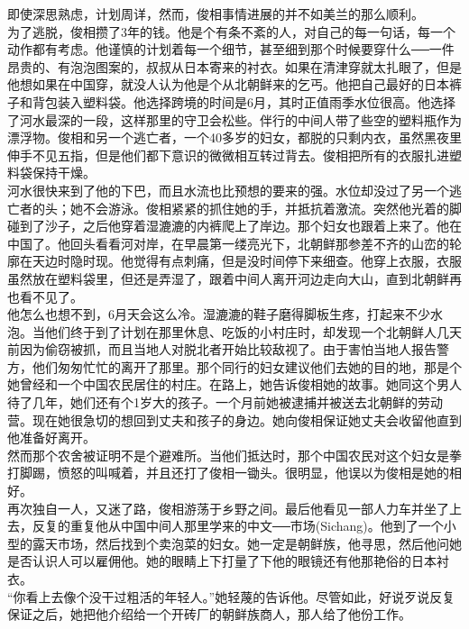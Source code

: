 即使深思熟虑，计划周详，然而，俊相事情进展的并不如美兰的那么顺利。\\

为了逃脱，俊相攒了3年的钱。他是个有条不紊的人，对自己的每一句话，每一个动作都有考虑。他谨慎的计划着每一个细节，甚至细到那个时候要穿什么──一件昂贵的、有泡泡图案的，叔叔从日本寄来的衬衣。如果在清津穿就太扎眼了，但是他想如果在中国穿，就没人认为他是个从北朝鲜来的乞丐。他把自己最好的日本裤子和背包装入塑料袋。他选择跨境的时间是6月，其时正值雨季水位很高。他选择了河水最深的一段，这样那里的守卫会松些。伴行的中间人带了些空的塑料瓶作为漂浮物。俊相和另一个逃亡者，一个40多岁的妇女，都脱的只剩内衣，虽然黑夜里伸手不见五指，但是他们都下意识的微微相互转过背去。俊相把所有的衣服扎进塑料袋保持干燥。\\

河水很快来到了他的下巴，而且水流也比预想的要来的强。水位却没过了另一个逃亡者的头；她不会游泳。俊相紧紧的抓住她的手，并抵抗着激流。突然他光着的脚碰到了沙子，之后他穿着湿漉漉的内裤爬上了岸边。那个妇女也跟着上来了。他在中国了。他回头看看河对岸，在早晨第一缕亮光下，北朝鲜那参差不齐的山峦的轮廓在天边时隐时现。他觉得有点刺痛，但是没时间停下来细查。他穿上衣服，衣服虽然放在塑料袋里，但还是弄湿了，跟着中间人离开河边走向大山，直到北朝鲜再也看不见了。\\

他怎么也想不到，6月天会这么冷。湿漉漉的鞋子磨得脚板生疼，打起来不少水泡。当他们终于到了计划在那里休息、吃饭的小村庄时，却发现一个北朝鲜人几天前因为偷窃被抓，而且当地人对脱北者开始比较敌视了。由于害怕当地人报告警方，他们匆匆忙忙的离开了那里。那个同行的妇女建议他们去她的目的地，那是个她曾经和一个中国农民居住的村庄。在路上，她告诉俊相她的故事。她同这个男人待了几年，她们还有个1岁大的孩子。一个月前她被逮捕并被送去北朝鲜的劳动营。现在她很急切的想回到丈夫和孩子的身边。她向俊相保证她丈夫会收留他直到他准备好离开。\\

然而那个农舍被证明不是个避难所。当他们抵达时，那个中国农民对这个妇女是拳打脚踢，愤怒的叫喊着，并且还打了俊相一锄头。很明显，他误以为俊相是她的相好。\\

再次独自一人，又迷了路，俊相游荡于乡野之间。最后他看见一部人力车并坐了上去，反复的重复他从中国中间人那里学来的中文──市场(Sichang)。他到了一个小型的露天市场，然后找到个卖泡菜的妇女。她一定是朝鲜族，他寻思，然后他问她是否认识人可以雇佣他。她的眼睛上下打量了下他的眼镜还有他那艳俗的日本衬衣。\\

“你看上去像个没干过粗活的年轻人。”她轻蔑的告诉他。尽管如此，好说歹说反复保证之后，她把他介绍给一个开砖厂的朝鲜族商人，那人给了他份工作。\\

